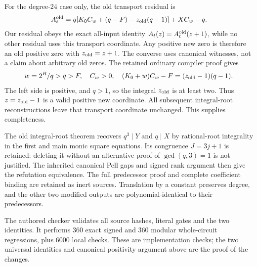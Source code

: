 For the degree-24 case only, the old transport residual is
\[
 A_t^{\rm old}=q[K_0C_w+(q-F)-z_{\rm old}(q-1)]+XC_w-q.
\]
Our residual obeys the exact all-input identity $A_t(z)=A_t^{\rm old}(z+1)$, while no other residual uses this transport coordinate. Any positive new zero is therefore an old positive zero with $z_{\rm old}=z+1$. The converse uses canonical witnesses, not a claim about arbitrary old zeros. The retained ordinary compiler proof gives
\[
 w=2^R/q>q>F,\quad C_w>0,\quad
 (K_0+w)C_w-F=(z_{\rm old}-1)(q-1).
\]
The left side is positive, and $q>1$, so the integral $z_{\rm old}$ is at least two. Thus $z=z_{\rm old}-1$ is a valid positive new coordinate. All subsequent integral-root reconstructions leave that transport coordinate unchanged. This supplies completeness.

The old integral-root theorem recovers $q^3\mid Y$ and $q\mid X$ by rational-root integrality in the first and main monic square equations. Its congruence $J=3j+1$ is retained: deleting it without an alternative proof of $\gcd(q,3)=1$ is not justified. The inherited canonical Pell gaps and signed rank argument then give the refutation equivalence. The full predecessor proof and complete coefficient binding are retained as inert sources. Translation by a constant preserves degree, and the other two modified outputs are polynomial-identical to their predecessors.

The authored checker validates all source hashes, literal gates and the two identities. It performs 360 exact signed and 360 modular whole-circuit regressions, plus 6000 local checks. These are implementation checks; the two universal identities and canonical positivity argument above are the proof of the changes.
